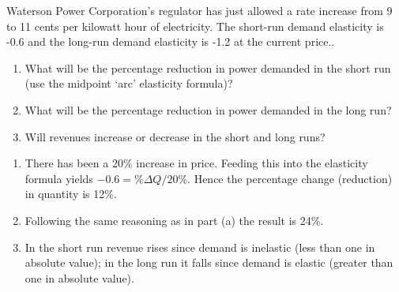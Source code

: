 \begin{enumialphparenastyle}
\begin{econex}\label{ex:ch4ex5}
Waterson Power Corporation's regulator has just allowed a rate increase from 9 to 11 cents per kilowatt hour of electricity. The short-run demand elasticity is -0.6 and the long-run demand elasticity is -1.2 at the current price..
\begin{enumerate}
\item	What will be the percentage reduction in power demanded in the short run (use the midpoint `arc' elasticity formula)?
\item	What will be the percentage reduction in power demanded in the long run?
\item	Will revenues increase or decrease in the short and long runs?
\end{enumerate}
\begin{econsolution}
\begin{enumerate}
\item	There has been a 20\% increase in price. Feeding this into the elasticity formula yields $-0.6=\%\Delta Q/20\%$. Hence the percentage change (reduction) in quantity is 12\%.
\item	Following the same reasoning as in part (a) the result is 24\%.
\item	In the short run revenue rises since demand is inelastic (less than one in absolute value); in the long run it falls since demand is elastic (greater than one in absolute value).
\end{enumerate}
\end{econsolution}
\end{econex}


\end{enumialphparenastyle}
